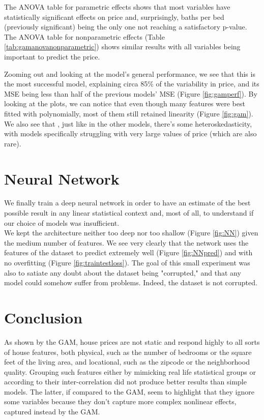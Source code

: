 \documentclass[a4paper, 11pt]{article}
\begin{document}
\begin{multicols}{2}
The ANOVA table for parametric effects shows that most variables have statistically significant effects on price and, surprisingly, baths per bed (previously significant) being the only one not reaching a satisfactory p-value. The ANOVA table for nonparametric effects (Table \ref{tab:gamanovanonparametric}) shows similar results with all variables being important to predict the price.

Zooming out and looking at the model's general performance, we see that this is the most successful model, explaining circa 85\% of the variability in price, and its MSE being less than half of the previous models' MSE (Figure \ref{fig:gamperf}). By looking at the plots, we can notice that even though many features were best fitted with polynomially, most of them still retained linearity (Figure \ref{fig:gam}). We also see that , just like in the other models, there's some heteroskedasticity, with models specifically struggling with very large values of price (which are also rare). 


\section{Neural Network} \vspace{-7pt}
We finally train a deep neural network in order to have an estimate of the best possible result in any linear statistical context and, most of all, to understand if our choice of models was insufficient.\\
We kept the architecture neither too deep nor too shallow (Figure \ref{fig:NN}) given the medium number of features. We see very clearly that the network uses the features of the dataset to predict extremely well (Figure \ref{fig:NNpred}) and with no overfitting (Figure \ref{fig:traintestloss}). The goal of this small experiment was also to satiate any doubt about the dataset being "corrupted," and that any model could somehow suffer from problems. Indeed, the dataset is not corrupted.

\section{Conclusion} \vspace{-7pt}
\noindent
As shown by the GAM, house prices are not static and respond highly to all sorts of house features, both physical, such as the number of bedrooms or the square feet of the living area, and locational, such as the zipcode or the neighborhood quality. Grouping such features either by mimicking real life statistical groups or according to their inter-correlation did not produce better results than simple models. The latter, if compared to the GAM, seem to highlight that they ignore some variables because they don't capture more complex nonlinear effects, captured instead by the GAM. 
\end{multicols}
\end{document}

